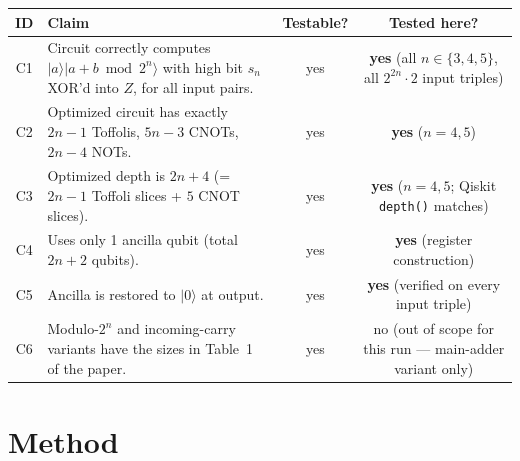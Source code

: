\documentclass[11pt]{article}
\begin{document}
\begin{center}
\begin{tabular}{clcc}
\toprule
ID & Claim & Testable? & Tested here? \\ \midrule
C1 & Circuit correctly computes $\lvert a\rangle\lvert a{+}b \bmod 2^n\rangle$
   with high bit $s_n$ XOR'd into $Z$, for all input pairs. & yes & \textbf{yes} (all $n\in\{3,4,5\}$, all $2^{2n}\cdot 2$ input triples) \\
C2 & Optimized circuit has exactly $2n-1$ Toffolis, $5n-3$ CNOTs, $2n-4$ NOTs. & yes & \textbf{yes} ($n{=}4,5$) \\
C3 & Optimized depth is $2n+4$ (= $2n-1$ Toffoli slices + $5$ CNOT slices). & yes & \textbf{yes} ($n{=}4,5$; Qiskit \texttt{depth()} matches) \\
C4 & Uses only 1 ancilla qubit (total $2n+2$ qubits). & yes & \textbf{yes} (register construction) \\
C5 & Ancilla is restored to $\lvert 0\rangle$ at output. & yes & \textbf{yes} (verified on every input triple) \\
C6 & Modulo-$2^n$ and incoming-carry variants have the sizes in Table~1 of the paper. & yes & no (out of scope for this run --- main-adder variant only) \\
\bottomrule
\end{tabular}
\end{center}

\section{Method}
\label{sec:method}
\end{document}
